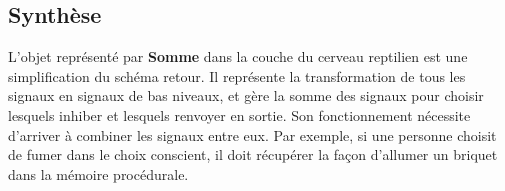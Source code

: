 \subsection{Synthèse}
L’objet représenté par \textbf{Somme} dans la couche du cerveau reptilien
est une simplification du schéma retour. Il représente la transformation de tous les
signaux en signaux de bas niveaux, et gère la somme des signaux pour choisir
lesquels inhiber et lesquels renvoyer en sortie. Son fonctionnement nécessite
d’arriver à combiner les signaux entre eux. Par exemple, si une personne choisit
de fumer dans le choix conscient, il doit récupérer la façon d’allumer un
briquet dans la mémoire procédurale.
